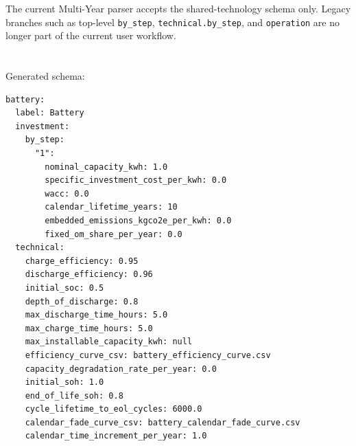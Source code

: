 \documentclass[11pt,a4paper]{report}
\newcommand{\code}[1]{\texttt{#1}}
\begin{document}
The current Multi-Year parser accepts the shared-technology schema only. Legacy branches such as top-level \code{by\_step}, \code{technical.by\_step}, and \code{operation} are no longer part of the current user workflow.

\section{}

Generated schema:

\begin{lstlisting}[style=mgpy]
battery:
  label: Battery
  investment:
    by_step:
      "1":
        nominal_capacity_kwh: 1.0
        specific_investment_cost_per_kwh: 0.0
        wacc: 0.0
        calendar_lifetime_years: 10
        embedded_emissions_kgco2e_per_kwh: 0.0
        fixed_om_share_per_year: 0.0
  technical:
    charge_efficiency: 0.95
    discharge_efficiency: 0.96
    initial_soc: 0.5
    depth_of_discharge: 0.8
    max_discharge_time_hours: 5.0
    max_charge_time_hours: 5.0
    max_installable_capacity_kwh: null
    efficiency_curve_csv: battery_efficiency_curve.csv
    capacity_degradation_rate_per_year: 0.0
    initial_soh: 1.0
    end_of_life_soh: 0.8
    cycle_lifetime_to_eol_cycles: 6000.0
    calendar_fade_curve_csv: battery_calendar_fade_curve.csv
    calendar_time_increment_per_year: 1.0
\end{lstlisting}
\end{document}
